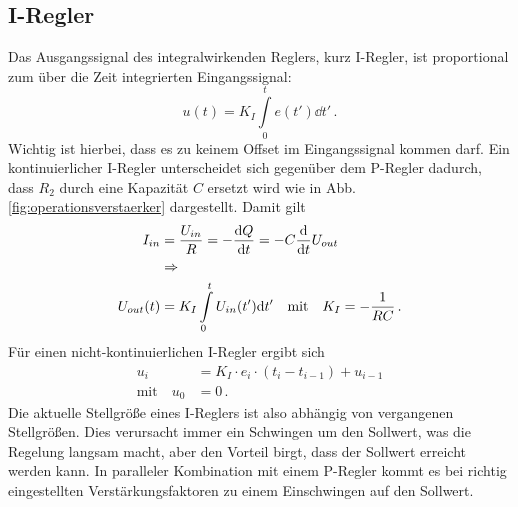 \subsection{I-Regler}\label{i-regler}
Das Ausgangssignal des integralwirkenden Reglers, kurz I-Regler, ist
proportional zum über die Zeit integrierten Eingangssignal:
\begin{equation}\label{eq:i-regler_01}
	u(t)=K_I\int\limits_0^te(t')\dd{t'}\,.
\end{equation}
Wichtig ist hierbei, dass es zu keinem Offset im Eingangssignal kommen darf. Ein
kontinuierlicher I-Regler unterscheidet sich gegenüber dem P-Regler dadurch, dass $R_2$ durch eine
Kapazität $C$ ersetzt wird wie in Abb.
\ref{fig:operationsverstaerker}
dargestellt. Damit gilt
\begin{equation}\label{eq:i-regler_02}
	\begin{split}
		I_{in}&=\frac{U_{in}}{R}=-\frac{\mathrm{d} Q}{\mathrm{d} t}=-C\frac{\mathrm{d} }{\mathrm{d} t}U_{out}\\
		&\Rightarrow\\
		U_{out}(t)&=K_I\int\limits_0^tU_{in}(t')\mathrm{d}{t'}
		\quad\text{mit}\quad
		K_I=-\frac{1}{RC}\,.
	\end{split}
\end{equation}
Für einen nicht-kontinuierlichen I-Regler ergibt sich
\begin{equation}\label{eq:i-regler_03}
	\begin{split}
		u_i&=K_I\cdot e_i\cdot (t_i-t_{i-1})+u_{i-1}\\
		\text{mit}\quad
		u_{0}&=0\,.
	\end{split}
\end{equation}
Die aktuelle Stellgröße eines I-Reglers ist also abhängig von vergangenen
Stellgrößen. Dies verursacht immer ein Schwingen um den Sollwert, was die
Regelung langsam macht, aber den Vorteil birgt, dass der Sollwert erreicht
werden kann. In paralleler Kombination mit einem P-Regler kommt es bei richtig
eingestellten Verstärkungsfaktoren zu einem Einschwingen auf den Sollwert.

